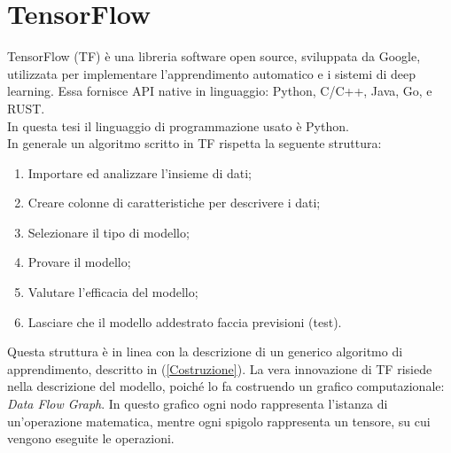 \documentclass[a4paper,12pt]{report}
\begin{document}
\chapter{TensorFlow}
TensorFlow (TF) \`{e} una libreria software open source, sviluppata da Google, utilizzata per implementare l'apprendimento automatico e i sistemi di deep learning. Essa fornisce API native in linguaggio: Python, C/C++, Java, Go, e RUST.\\
In questa tesi il linguaggio di programmazione usato \`{e} Python.\\
In generale un algoritmo scritto in TF rispetta la seguente struttura:
\begin{enumerate}
\item Importare ed analizzare l'insieme di dati;
\item Creare colonne di caratteristiche per descrivere i dati;
\item Selezionare il tipo di modello;
\item Provare il modello;
\item Valutare l'efficacia del modello;
\item Lasciare che il modello addestrato faccia previsioni (test).
\end{enumerate}
Questa struttura \`{e} in linea con la descrizione di un generico algoritmo di apprendimento, descritto in (\ref{Costruzione}). La vera innovazione di TF risiede nella descrizione del modello, poich\'{e} lo fa costruendo un grafico computazionale: \textit{Data Flow Graph}. In questo grafico ogni nodo rappresenta l'istanza di un'operazione matematica, mentre ogni spigolo rappresenta un tensore, su cui vengono eseguite le operazioni.
\newpage
\end{document}
